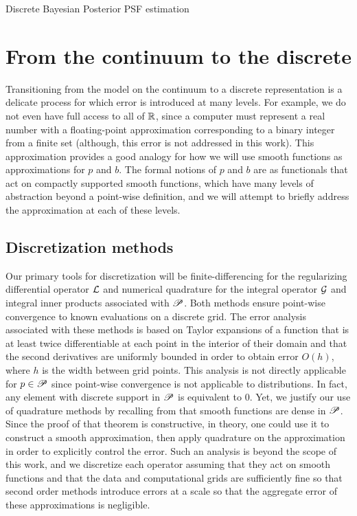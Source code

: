 \begin{chapter}{Discrete Bayesian Posterior PSF estimation}
\section{From the continuum to the discrete} \label{sec:discretization}

Transitioning from the model on the continuum to a discrete representation is a delicate process for which error is introduced at many levels.  
For example, we do not even have full access to all of $\mathbb R$, since a computer must represent a real number with a floating-point approximation corresponding to a binary integer from a finite set (although, this error is not addressed in this work). 
This approximation provides a good analogy for how we will use smooth functions as approximations for $p$ and $b$.
The formal notions of $p$ and $b$ are as functionals that act on compactly supported smooth functions, which have many levels of abstraction beyond a point-wise definition, and we will attempt to briefly address the approximation at each of these levels.

\subsection{Discretization methods}
Our primary tools for discretization will be finite-differencing for the regularizing differential operator $\mathcal L$ and numerical quadrature for the integral operator $\mathcal G$ and integral inner products associated with $\mathscr P$.
Both methods ensure point-wise convergence to known evaluations on a discrete grid.
The error analysis associated with these methods is based on Taylor expansions of a function that is at least twice differentiable at each point in the interior of their domain and that the second derivatives are uniformly bounded in order to obtain error $O(h)$, where $h$ is the width between grid points.
This analysis is not directly applicable for $p \in \mathscr P$ since point-wise convergence is not applicable to distributions.
In fact, any element with discrete support in $\mathscr P$ is equivalent to $0$.
Yet, we justify our use of quadrature methods by recalling from  that smooth functions are dense in $\mathscr P$.
  Since the proof of that theorem is constructive, in theory, one could use it to construct a smooth approximation, then apply quadrature on the approximation in order to explicitly control the error.
Such an analysis is beyond the scope of this work, and we discretize each operator assuming that they act on smooth functions and that the data and computational grids are sufficiently fine so that second order methods introduce errors at a scale so that the aggregate error of these approximations is negligible.


\end{chapter}
